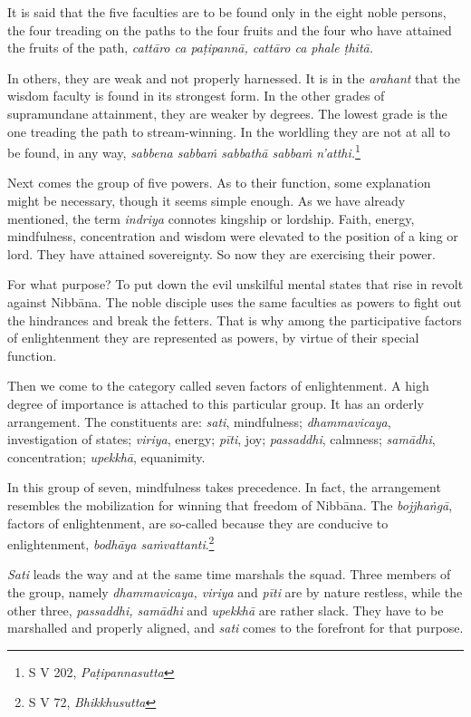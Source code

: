 It is said that the five faculties are to be found only in the eight noble persons, the four treading on the paths to the four fruits and the four who have attained the fruits of the path, \emph{cattāro ca paṭipannā, cattāro ca phale ṭhitā.}

In others, they are weak and not properly harnessed. It is in the \emph{arahant} that the wisdom faculty is found in its strongest form. In the other grades of supramundane attainment, they are weaker by degrees. The lowest grade is the one treading the path to stream-winning. In the worldling they are not at all to be found, in any way, \emph{sabbena sabbaṁ sabbathā sabbaṁ n'atthi.}\footnote{S V 202, \emph{Paṭipannasutta}}

Next comes the group of five powers. As to their function, some explanation might be necessary, though it seems simple enough. As we have already mentioned, the term \emph{indriya} connotes kingship or lordship. Faith, energy, mindfulness, concentration and wisdom were elevated to the position of a king or lord. They have attained sovereignty. So now they are exercising their power.

For what purpose? To put down the evil unskilful mental states that rise in revolt against Nibbāna. The noble disciple uses the same faculties as powers to fight out the hindrances and break the fetters. That is why among the participative factors of enlightenment they are represented as powers, by virtue of their special function.

Then we come to the category called seven factors of enlightenment. A high degree of importance is attached to this particular group. It has an orderly arrangement. The constituents are: \emph{sati}, mindfulness; \emph{dhammavicaya}, investigation of states; \emph{viriya}, energy; \emph{pīti}, joy; \emph{passaddhi}, calmness; \emph{samādhi}, concentration; \emph{upekkhā}, equanimity.

In this group of seven, mindfulness takes precedence. In fact, the arrangement resembles the mobilization for winning that freedom of Nibbāna. The \emph{bojjhaṅgā}, factors of enlightenment, are so-called because they are conducive to enlightenment, \emph{bodhāya saṁvattanti}.\footnote{S V 72, \emph{Bhikkhusutta}}

\emph{Sati} leads the way and at the same time marshals the squad. Three members of the group, namely \emph{dhammavicaya, viriya} and \emph{pīti} are by nature restless, while the other three, \emph{passaddhi, samādhi} and \emph{upekkhā} are rather slack. They have to be marshalled and properly aligned, and \emph{sati} comes to the forefront for that purpose.

